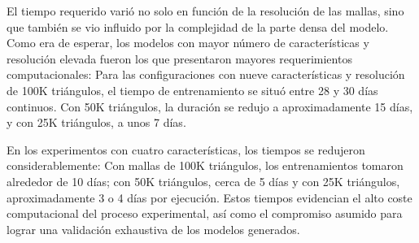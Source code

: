 El tiempo requerido varió no solo en función de la resolución de las mallas, sino que también se vio influido por la complejidad de la parte densa del modelo. Como era de esperar, los modelos con mayor número de características y resolución elevada fueron los que presentaron mayores requerimientos computacionales: Para las configuraciones con nueve características y resolución de 100K triángulos, el tiempo de entrenamiento se situó entre 28 y 30 días continuos. Con 50K triángulos, la duración se redujo a aproximadamente 15 días, y con 25K triángulos, a unos 7 días.

En los experimentos con cuatro características, los tiempos se redujeron considerablemente: Con mallas de 100K triángulos, los entrenamientos tomaron alrededor de 10 días; con 50K triángulos, cerca de 5 días y con 25K triángulos, aproximadamente 3 o 4 días por ejecución. Estos tiempos evidencian el alto coste computacional del proceso experimental, así como el compromiso asumido para lograr una validación exhaustiva de los modelos generados.

